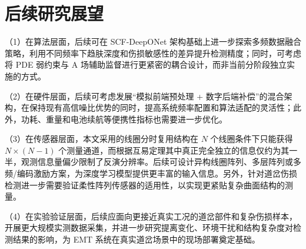 \section{后续研究展望}

（1）在算法层面，后续可在 SCF-DeepONet 架构基础上进一步探索多频数据融合策略，利用不同频率下趋肤深度和伤损敏感性的差异提升检测精度；同时，可考虑将 PDE 弱约束与 A 场辅助监督进行更紧密的耦合设计，而非当前分阶段独立实施的方式。

（2）在硬件层面，后续可考虑发展“模拟前端预处理 + 数字后端补偿”的混合架构，在保持现有高信噪比优势的同时，提高系统频率配置和算法适配的灵活性；此外，功耗、重量和电池续航等便携性指标也需要进一步优化。

（3）在传感器层面，本文采用的线圈分时复用结构在 $N$ 个线圈条件下只能获得 $N \times (N-1)$ 个测量通道，而根据互易定理其中真正完全独立的信息仅约为其一半，观测信息量偏少限制了反演分辨率。后续可设计异构线圈阵列、多层阵列或多频/编码激励方案，为深度学习模型提供更丰富的输入信息。另外，针对道岔伤损检测进一步需要验证柔性阵列传感器的适用性，以实现更紧贴复杂曲面结构的测量。

（4）在实验验证层面，后续应面向更接近真实工况的道岔部件和复杂伤损样本，开展更大规模实测数据采集，并进一步研究提离变化、环境干扰和结构复杂度对检测结果的影响，为 EMT 系统在真实道岔场景中的现场部署奠定基础。